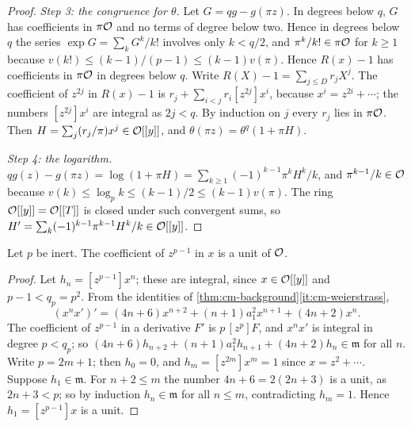 \begin{proof}
\emph{Step 3: the congruence for $\theta$.} Let $G=qg-g(\pi z)$. In degrees below $q$, $G$ has
coefficients in $\pi\mathcal{O}$ and no terms of degree below two. Hence in degrees below $q$ the series
$\exp G=\sum_kG^k/k!$ involves only $k<q/2$, and $\pi^k/k!\in\pi\mathcal{O}$ for $k\ge1$ because
$v(k!)\le(k-1)/(p-1)\le(k-1)v(\pi)$. Hence $R(x)-1$ has coefficients in $\pi\mathcal{O}$ in degrees below $q$.
Write $R(X)-1=\sum_{j\le D}r_jX^j$. The coefficient of $z^{2j}$ in $R(x)-1$ is
$r_j+\sum_{i<j}r_i[z^{2j}]x^i$, because $x^i=z^{2i}+\cdots$; the numbers $[z^{2j}]x^i$ are integral
as $2j<q$. By induction on $j$ every $r_j$ lies in $\pi\mathcal{O}$. Then
$H=\sum_j(r_j/\pi)x^j\in\mathcal{O}[[y]]$, and $\theta(\pi z)=\theta^q(1+\pi H)$.

\emph{Step 4: the logarithm.} $qg(z)-g(\pi z)=\log(1+\pi H)=\sum_{k\ge1}(-1)^{k-1}\pi^kH^k/k$, and
$\pi^{k-1}/k\in\mathcal{O}$ because $v(k)\le\log_pk\le(k-1)/2\le(k-1)v(\pi)$. The ring $\mathcal{O}[[y]]=\mathcal{O}[[T]]$ is
closed under such convergent sums, so $H'=\sum_k(-1)^{k-1}\pi^{k-1}H^k/k\in\mathcal{O}[[y]]$.
\end{proof}

\begin{lemma}\label{lem:supersingular}
Let $p$ be inert. The coefficient of $z^{p-1}$ in $x$ is a unit of $\mathcal{O}$.
\end{lemma}

\begin{proof}
Let $h_n=[z^{p-1}]x^n$; these are integral, since $x\in\mathcal{O}[[y]]$ and $p-1<q_p=p^2$. From the
identities of \cref{thm:cm-background}\ref{it:cm-weierstrass},
\[
  (x^nx')'=(4n+6)x^{n+2}+(n+1)a_1^2x^{n+1}+(4n+2)x^n .
\]
The coefficient of $z^{p-1}$ in a derivative $F'$ is $p\,[z^p]F$, and $x^nx'$ is integral in degree
$p<q_p$; so $(4n+6)h_{n+2}+(n+1)a_1^2h_{n+1}+(4n+2)h_n\in\mathfrak m$ for all $n$. Write $p=2m+1$;
then $h_0=0$, and $h_m=[z^{2m}]x^m=1$ since $x=z^2+\cdots$. Suppose $h_1\in\mathfrak m$. For
$n+2\le m$ the number $4n+6=2(2n+3)$ is a unit, as $2n+3<p$; so by induction $h_n\in\mathfrak m$ for
all $n\le m$, contradicting $h_m=1$. Hence $h_1=[z^{p-1}]x$ is a unit.
\end{proof}

